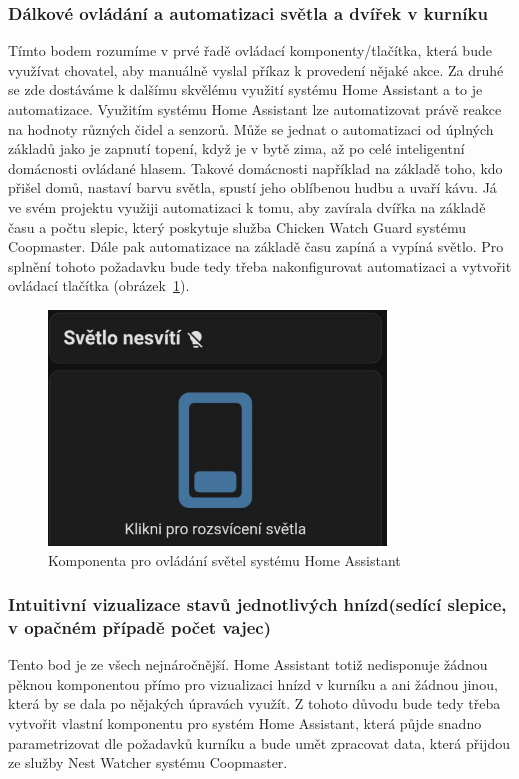 \subsubsection*{Dálkové ovládání a automatizaci světla a dvířek v kurníku}
Tímto bodem rozumíme v prvé řadě ovládací komponenty/tlačítka, která bude využívat chovatel, aby manuálně vyslal příkaz k provedení nějaké akce.
Za druhé se zde dostáváme k dalšímu skvělému využití systému Home Assistant a to je automatizace.
Využitím systému Home Assistant lze automatizovat právě reakce na hodnoty různých čidel a senzorů.
Může se jednat o automatizaci od úplných základů jako je zapnutí topení, když je v bytě zima, až po celé inteligentní domácnosti ovládané hlasem.
Takové domácnosti například na základě toho, kdo přišel domů, nastaví barvu světla, spustí jeho oblíbenou hudbu a uvaří kávu.
Já ve svém projektu využiji automatizaci k tomu, aby zavírala dvířka na základě času a počtu slepic, který poskytuje služba Chicken Watch Guard systému Coopmaster.
Dále pak automatizace na základě času zapíná a vypíná světlo.\newline
Pro splnění tohoto požadavku bude tedy třeba nakonfigurovat automatizaci a vytvořit ovládací tlačítka (obrázek~\ref{fig:homeassitant_lamp_button}).

\begin{figure}[H]
    \centering
    \includegraphics[width=0.8\textwidth]{img/homeasistant_lamp_button.png}
    \caption{Komponenta pro ovládání světel systému Home Assistant}
    \label{fig:homeassitant_lamp_button}
\end{figure}



\subsubsection*{Intuitivní vizualizace stavů jednotlivých hnízd(sedící slepice, v opačném případě počet vajec)}
Tento bod je ze všech nejnáročnější.
Home Assistant totiž nedisponuje žádnou pěknou komponentou přímo pro vizualizaci hnízd v kurníku a ani žádnou jinou, která by se dala po nějakých úpravách využít.\newline
Z tohoto důvodu bude tedy třeba vytvořit vlastní komponentu pro systém Home Assistant, která půjde snadno parametrizovat dle požadavků kurníku a bude umět zpracovat data, která přijdou ze služby Nest Watcher systému Coopmaster.

